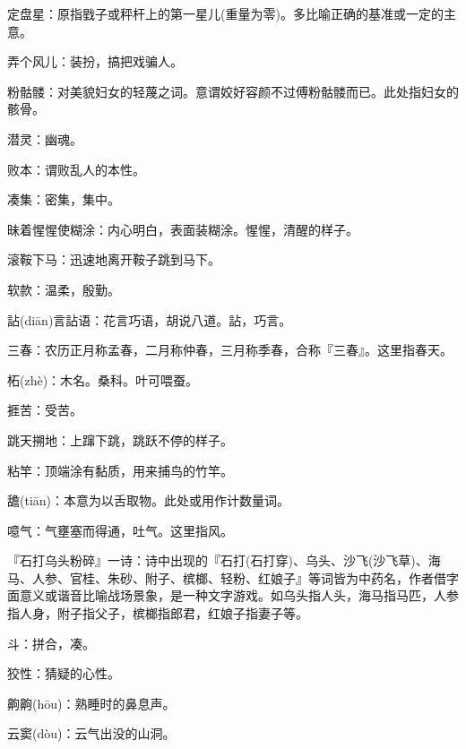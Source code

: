 \startbuffer[1031]
定盘星：原指戥子或秤杆上的第一星儿(重量为零)。多比喻正确的基准或一定的主意。
\stopbuffer


\startbuffer[1032]
弄个风儿：装扮，搞把戏骗人。
\stopbuffer


\startbuffer[1033]
粉骷髅：对美貌妇女的轻蔑之词。意谓姣好容颜不过傅粉骷髅而已。此处指妇女的骸骨。
\stopbuffer


\startbuffer[1034]
潜灵：幽魂。
\stopbuffer


\startbuffer[1035]
败本：谓败乱人的本性。
\stopbuffer


\startbuffer[1036]
凑集：密集，集中。
\stopbuffer


\startbuffer[1037]
昧着惺惺使糊涂：内心明白，表面装糊涂。惺惺，清醒的样子。
\stopbuffer


\startbuffer[1038]
滚鞍下马：迅速地离开鞍子跳到马下。
\stopbuffer


\startbuffer[1039]
软款：温柔，殷勤。
\stopbuffer


\startbuffer[1040]
詀(diān)言詀语：花言巧语，胡说八道。詀，巧言。
\stopbuffer


\startbuffer[1041]
三春：农历正月称孟春，二月称仲春，三月称季春，合称『三春』。这里指春天。
\stopbuffer


\startbuffer[1042]
柘(zhè)：木名。桑科。叶可喂蚕。
\stopbuffer


\startbuffer[1043]
捱苦：受苦。
\stopbuffer


\startbuffer[1044]
跳天搠地：上蹿下跳，跳跃不停的样子。
\stopbuffer


\startbuffer[1045]
粘竿：顶端涂有黏质，用来捕鸟的竹竿。
\stopbuffer


\startbuffer[1046]
舚(tiān)：本意为以舌取物。此处或用作计数量词。
\stopbuffer


\startbuffer[1047]
噫气：气壅塞而得通，吐气。这里指风。
\stopbuffer


\startbuffer[1048]
『石打乌头粉碎』一诗：诗中出现的『石打(石打穿)、乌头、沙飞(沙飞草)、海马、人参、官桂、朱砂、附子、槟榔、轻粉、红娘子』等词皆为中药名，作者借字面意义或谐音比喻战场景象，是一种文字游戏。如乌头指人头，海马指马匹，人参指人身，附子指父子，槟榔指郎君，红娘子指妻子等。
\stopbuffer


\startbuffer[1049]
斗：拼合，凑。
\stopbuffer


\startbuffer[1050]
狡性：猜疑的心性。
\stopbuffer


\startbuffer[1051]
齁齁(hōu)：熟睡时的鼻息声。
\stopbuffer


\startbuffer[1052]
云窦(dòu)：云气出没的山洞。
\stopbuffer


